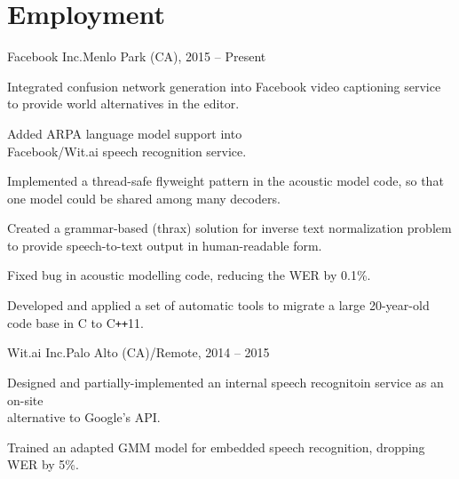\documentclass[11pt,a4paper]{article}
\begin{document}
\section{Employment}
\begin{multicols}{2}
  \raggedcolumns

  \begin{project1}{Facebook Inc.}{Menlo Park (CA), 2015 -- Present}
    \begin{items}
    \item Integrated confusion network generation into Facebook video
      captioning service to provide world alternatives in the editor.
    \item Added ARPA language model support into\\Facebook/Wit.ai speech
      recognition service.
    \item Implemented a thread-safe flyweight pattern in the acoustic model
      code, so that one model could be shared among many decoders.
    \item Created a grammar-based (thrax) solution for inverse text
      normalization problem to provide speech-to-text output in human-readable
      form.
    \item Fixed bug in acoustic modelling code, reducing the WER by 0.1\%.
    \item Developed and applied a set of automatic tools to migrate a large
      20-year-old code base in C to C\texttt{++}11.
    \end{items}
  \end{project1}

  \columnbreak

  \begin{project1}{Wit.ai Inc.}{Palo Alto (CA)/Remote, 2014 -- 2015}
    \begin{items}
    \item Designed and partially-implemented an internal speech recognitoin
      service as an on-site\\alternative to Google's API.
    \item Trained an adapted GMM model for embedded speech recognition,
      dropping WER by 5\%.
    \end{items}
  \end{project1}


\end{multicols}
\end{document}
